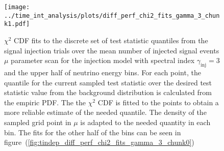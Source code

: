 \begin{figure}[H]
  \centering
  \texttt{[image: ../time\_int\_analysis/plots/diff\_perf\_chi2\_fits\_gamma\_3\_chunk1.pdf]}
  \caption[$\chi^2$ CDF fits for the time-integrated diff. performance, $\gamma_\text{inj}=3$ -- part 2]{
     $\chi^2$ CDF fits to the discrete set of test statistic quantiles from the signal injection trials over the mean number of injected signal events $\mu$ parameter scan for the injection model with spectral index $\gamma_\text{inj}=3$ and the upper half of neutrino energy bins.
     For each point, the quantile for the current sampled test statistic over the desired test statistic value from the background distribution is calculated from the empiric PDF.
     The the $\chi^2$ CDF is fitted to the points to obtain a more reliable estimate of the needed quantile.
     The density of the sampled grid point in $\mu$ is adapted to the needed quantity in each bin.
     The fits for the other half of the bins can be seen in figure~(\ref{fig:tindep_diff_perf_chi2_fits_gamma_3_chunk0})
  }
  \label{fig:tindep_diff_perf_chi2_fits_gamma_3_chunk1}
\end{figure}

